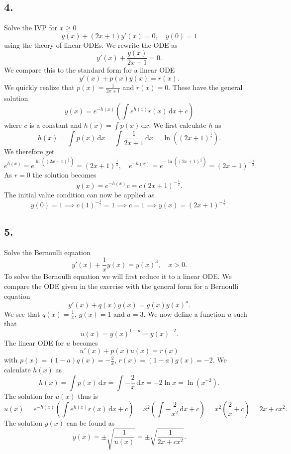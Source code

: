 \subsection*{4.} Solve the IVP for $x \geq 0$
\[ 
y(x) + \left( 2x+1 \right)y'(x) = 0, \quad y(0) = 1
\]
using the theory of linear ODEs.
\bigbreak
We rewrite the ODE as
\[ 
y'(x) + \frac{y(x)}{2x+1} = 0
.\]
We compare this to the standard form for a linear ODE
\[ 
  y'(x) + p(x) y(x) = r(x)
.\]
We quickly realize that $p(x) = \frac{1}{2x+1}$ and $r(x) = 0$. These have the general solution
\[ 
y(x) = e^{-h(x)} \left( \int e^{h(x)}r(x) \, \mathrm{d}x + c \right)
\]
where $c$ is a constant and $h(x) = \int p(x) \, \mathrm{d}x$. We first calculate $h$ as
\[ 
h(x) = \int p(x) \, \mathrm{d}x = \int \frac{1}{2x+1} \, \mathrm{d}x = \ln \left( \left( 2x+1 \right)^{\frac{1}{2}} \right)
.\]
We therefore get
\[ 
e^{h(x)} = e^{\ln \left( \left( 2x+1 \right)^{\frac{1}{2}} \right)} = \left( 2x+1 \right)^{\frac{1}{2}}, \quad e^{-h(x)} = e^{-\ln \left( \left( 2x+1 \right)^{\frac{1}{2}} \right)} = \left( 2x+1 \right)^{-\frac{1}{2}}
.\]
As $r = 0$ the solution becomes
\[
  y(x) = e^{-h(x)}c = c \left( 2x+1 \right)^{-\frac{1}{2}}
.\]
The initial value condition can now be applied as
\[ 
y(0) = 1 \implies c \left( 1 \right)^{-\frac{1}{2}} = 1 \implies c = 1 \implies y(x) = \left( 2x+1 \right)^{-\frac{1}{2}}
.\]


\subsection*{5.} Solve the Bernoulli equation
\[ 
y'(x) + \frac{1}{x} y(x) = y(x)^3, \quad x > 0
.\]
\bigbreak
To solve the Bernoulli equation we will first reduce it to a linear ODE. We compare the ODE given in the exercise with the general form for a Bernoulli equation
\[ 
y'(x) + q(x) y(x) = g(x) y(x)^{a}
.\]
We see that $q(x) = \frac{1}{x}$, $g(x) = 1$ and $a = 3$. We now define a function $u$ such that
\[ 
u(x) = y(x)^{1-a} = y(x)^{-2}
.\]
The linear ODE for $u$ becomes
\[ 
u'(x) + p(x) u(x) = r(x)
\]
with $p(x) = (1-a)q(x) = -\frac{2}{x}$, $r(x) = (1-a)g(x) = -2$. We calculate $h(x)$ as
\[ 
h(x) = \int p(x) \, \mathrm{d}x = \int -\frac{2}{x} \, \mathrm{d}x = -2 \ln x = \ln (x^{-2})
.\]
The solution for $u(x)$ thus is
\[ 
u(x) = e^{-h(x)} \left( \int e^{h(x)} r(x) \, \mathrm{d}x + c \right) = x^2 \left( \int - \frac{2}{x^2} \, \mathrm{d}x + c \right) = x^2 \left( \frac{2}{x} + c \right) = 2x + cx^2
.\]
The solution $y(x)$ can be found as
\[ 
y(x) = \pm \sqrt{\frac{1}{u(x)}} = \pm \sqrt{\frac{1}{2x + cx^2}}
.\]

